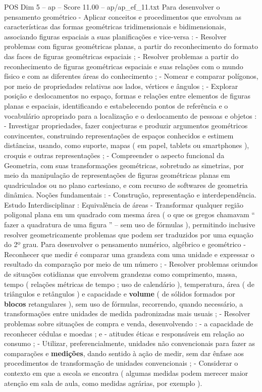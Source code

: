 \begin{textsample}{POS Dim 5 – ap – Score 11.00 – ap/ap\_ef\_11.txt}
Para desenvolver o pensamento geométrico - Aplicar conceitos e procedimentos que envolvam as características das formas geométricas tridimensionais e bidimensionais, associando figuras espaciais a suas planificações e vice-versa : - Resolver problemas com figuras geométricas planas, a partir do reconhecimento do formato das faces de figuras geométricas espaciais ; - Resolver problemas a partir do reconhecimento de figuras geométricas espaciais e suas relações com o mundo físico e com as diferentes áreas do conhecimento ; - Nomear e comparar polígonos, por meio de propriedades relativas aos lados, vértices e ângulos ; - Explorar posição e deslocamentos no espaço, formas e relações entre elementos de figuras planas e espaciais, identificando e estabelecendo pontos de referência e o vocabulário apropriado para a localização e o deslocamento de pessoas e objetos : - Investigar propriedades, fazer conjecturas e produzir argumentos geométricos convincentes, construindo representações de espaços conhecidos e estimem distâncias, usando, como suporte, mapas ( em papel, tablets ou smartphones ), croquis e outras representações ; - Compreender o aspecto funcional da Geometria, com suas transformações geométricas, sobretudo as simetrias, por meio da manipulação de representações de figuras geométricas planas em quadriculados ou no plano cartesiano, e com recurso de softwares de geometria dinâmica.
Noções fundamentais : - Construção, representação e interdependência.
Estudo Interdisciplinar : Equivalência de áreas - Transformar qualquer região poligonal plana em um quadrado com mesma área ( o que os gregos chamavam “ fazer a quadratura de uma figura ” – sem uso de fórmulas ), permitindo inclusive resolver geometricamente problemas que podem ser traduzidos por uma equação do 2º grau.
Para desenvolver o pensamento numérico, algébrico e geométrico - Reconhecer que medir é comparar uma grandeza com uma unidade e expressar o resultado da comparação por meio de um número ; - Resolver problemas oriundos de situações cotidianas que envolvem grandezas como comprimento, massa, tempo ( relações métricas de tempo ; uso de calendário ), temperatura, área ( de triângulos e retângulos ) e capacidade e \textbf{volume} ( de sólidos formados por \textbf{blocos} retangulares ), sem uso de fórmulas, recorrendo, quando necessário, a transformações entre unidades de medida padronizadas mais usuais ; - Resolver problemas sobre situações de compra e venda, desenvolvendo : - a capacidade de reconhecer cédulas e moedas ; e - atitudes éticas e responsáveis em relação ao consumo ; - Utilizar, preferencialmente, unidades não convencionais para fazer as comparações e \textbf{medições}, dando sentido à ação de medir, sem dar ênfase aos procedimentos de transformação de unidades convencionais ; - Considerar o contexto em que a escola se encontra ( algumas medidas podem merecer maior atenção em sala de aula, como medidas agrárias, por exemplo ).

\end{textsample}
